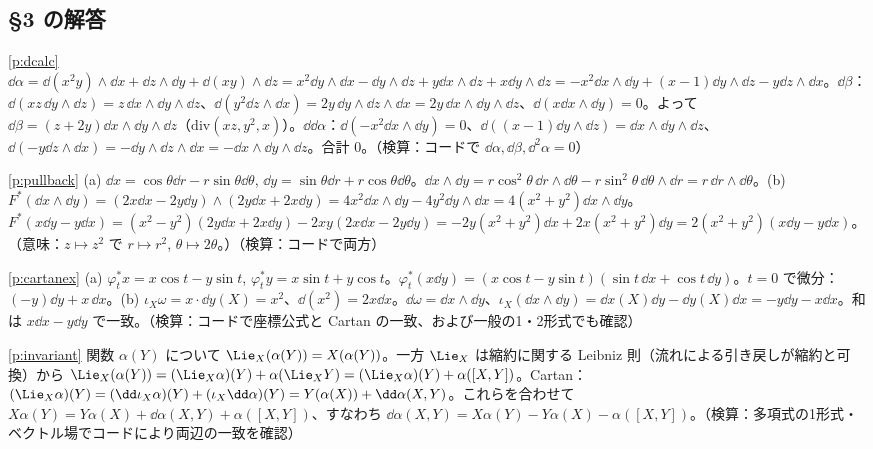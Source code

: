 \subsection*{§3 の解答}
\begin{sol}{\ref{p:dcalc}}
$\dd\alpha=\dd(x^2y)\wedge\dd x+\dd z\wedge\dd y+\dd(xy)\wedge\dd z=x^2\dd y\wedge\dd x-\dd y\wedge\dd z+y\dd x\wedge\dd z+x\dd y\wedge\dd z=-x^2\dd x\wedge\dd y+(x-1)\dd y\wedge\dd z-y\dd z\wedge\dd x$。$\dd\beta$：$\dd(xz\,\dd y\wedge\dd z)=z\,\dd x\wedge\dd y\wedge\dd z$、$\dd(y^2\dd z\wedge\dd x)=2y\,\dd y\wedge\dd z\wedge\dd x=2y\,\dd x\wedge\dd y\wedge\dd z$、$\dd(x\dd x\wedge\dd y)=0$。よって $\dd\beta=(z+2y)\dd x\wedge\dd y\wedge\dd z$（$\mathrm{div}(xz,y^2,x)$）。$\dd\dd\alpha$：$\dd(-x^2\dd x\wedge\dd y)=0$、$\dd((x-1)\dd y\wedge\dd z)=\dd x\wedge\dd y\wedge\dd z$、$\dd(-y\dd z\wedge\dd x)=-\dd y\wedge\dd z\wedge\dd x=-\dd x\wedge\dd y\wedge\dd z$。合計 $0$。（検算：コードで $\dd\alpha,\dd\beta,\dd^2\alpha=0$）
\end{sol}
\begin{sol}{\ref{p:pullback}}
(a) $\dd x=\cos\theta\dd r-r\sin\theta\dd\theta$, $\dd y=\sin\theta\dd r+r\cos\theta\dd\theta$。$\dd x\wedge\dd y=r\cos^2\theta\,\dd r\wedge\dd\theta-r\sin^2\theta\,\dd\theta\wedge\dd r=r\,\dd r\wedge\dd\theta$。(b) $F^*(\dd x\wedge\dd y)=(2x\dd x-2y\dd y)\wedge(2y\dd x+2x\dd y)=4x^2\dd x\wedge\dd y-4y^2\dd y\wedge\dd x=4(x^2+y^2)\dd x\wedge\dd y$。$F^*(x\dd y-y\dd x)=(x^2-y^2)(2y\dd x+2x\dd y)-2xy(2x\dd x-2y\dd y)=-2y(x^2+y^2)\dd x+2x(x^2+y^2)\dd y=2(x^2+y^2)(x\dd y-y\dd x)$。（意味：$z\mapsto z^2$ で $r\mapsto r^2$, $\theta\mapsto2\theta$。）（検算：コードで両方）
\end{sol}
\begin{sol}{\ref{p:cartanex}}
(a) $\varphi_t^*x=x\cos t-y\sin t$, $\varphi_t^*y=x\sin t+y\cos t$。$\varphi_t^*(x\dd y)=(x\cos t-y\sin t)(\sin t\,\dd x+\cos t\,\dd y)$。$t=0$ で微分：$(-y)\dd y+x\,\dd x$。(b) $\iota_X\omega=x\cdot\dd y(X)=x^2$、$\dd(x^2)=2x\dd x$。$\dd\omega=\dd x\wedge\dd y$、$\iota_X(\dd x\wedge\dd y)=\dd x(X)\dd y-\dd y(X)\dd x=-y\dd y-x\dd x$。和は $x\dd x-y\dd y$ で一致。（検算：コードで座標公式と Cartan の一致、および一般の1・2形式でも確認）
\end{sol}
\begin{sol}{\ref{p:invariant}}
関数 $\alpha(Y)$ について $\Lie_X(\alpha(Y))=X(\alpha(Y))$。一方 $\Lie_X$ は縮約に関する Leibniz 則（流れによる引き戻しが縮約と可換）から $\Lie_X(\alpha(Y))=(\Lie_X\alpha)(Y)+\alpha(\Lie_XY)=(\Lie_X\alpha)(Y)+\alpha([X,Y])$。Cartan：$(\Lie_X\alpha)(Y)=(\dd\iota_X\alpha)(Y)+(\iota_X\dd\alpha)(Y)=Y(\alpha(X))+\dd\alpha(X,Y)$。これらを合わせて $X\alpha(Y)=Y\alpha(X)+\dd\alpha(X,Y)+\alpha([X,Y])$、すなわち $\dd\alpha(X,Y)=X\alpha(Y)-Y\alpha(X)-\alpha([X,Y])$。（検算：多項式の1形式・ベクトル場でコードにより両辺の一致を確認）
\end{sol}

